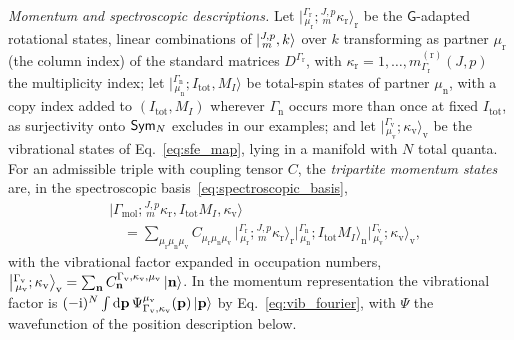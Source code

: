 \documentclass[
  reprint,
  aps,
  prx,
  superscriptaddress,
  amsmath,
  amssymb,
  longbibliography
]{revtex4-2}
\newcommand{\grp}[1]{\mathsf{#1}}
\newcommand{\Sym}[1]{\grp{Sym_{#1}}}
\newcommand{\iunit}{\mathrm{i}}
\newcommand{\diff}{\mathrm{d}}
\newcommand{\repD}[1]{D^{#1}}
\newcommand{\mult}{\kappa}
\newcommand{\cgket}[3]{\bigl\lvert{}^{#1}_{\,#2};#3\bigr\rangle}
\newcommand{\parity}{p}               %
\providecommand{\Gmol}{\Gamma_{\mathrm{mol}}}
\providecommand{\Grot}{\Gamma_{\mathrm{r}}}
\providecommand{\Gvib}{\Gamma_{\mathrm{v}}}
\providecommand{\Gspin}{\Gamma_{\mathrm{n}}}
\begin{document}
\emph{Momentum and spectroscopic descriptions.} Let $\cgket{\Grot}{\mu_{\mathrm r}}{{}^{J,\parity}_{\,m}\mult_{\mathrm r}}_{\mathrm r}$ be the $\grp{G}$-adapted rotational states, linear combinations of $\ket{{}^{J,\parity}_{\,m},k}$ over $k$ transforming as partner $\mu_{\mathrm r}$ (the column index) of the standard matrices $\repD{\Grot}$, with $\mult_{\mathrm r}=1,\dots,m^{(\mathrm r)}_{\Grot}(J,\parity)$ the multiplicity index; let $\cgket{\Gspin}{\mu_{\mathrm n}}{I_{\mathrm{tot}},M_I}$ be total-spin states of partner $\mu_{\mathrm n}$, with a copy index added to $(I_{\mathrm{tot}},M_I)$ wherever $\Gspin$ occurs more than once at fixed $I_{\mathrm{tot}}$, as surjectivity onto $\Sym{\mathnormal{N}}$ excludes in our examples; and let $\cgket{\Gvib}{\mu_{\mathrm v}}{\mult_{\mathrm v}}_{\mathrm v}$ be the vibrational states of Eq.~\eqref{eq:sfe_map}, lying in a manifold with $N$ total quanta. For an admissible triple with coupling tensor $C$, the \emph{tripartite momentum states} are, in the spectroscopic basis~\eqref{eq:spectroscopic_basis},
\begin{align}
  &\bigl|\Gmol;{}^{J,\parity}_{\,m}\mult_{\mathrm r},I_{\mathrm{tot}}M_I,\mult_{\mathrm v}\bigr\rangle
  \nonumber\\
  &\quad=\!\!\sum_{\mu_{\mathrm r}\mu_{\mathrm n}\mu_{\mathrm v}}\!\!
  C_{\mu_{\mathrm r}\mu_{\mathrm n}\mu_{\mathrm v}}\,
  \cgket{\Grot}{\mu_{\mathrm r}}{{}^{J,\parity}_{\,m}\mult_{\mathrm r}}_{\mathrm r}
  \cgket{\Gspin}{\mu_{\mathrm n}}{I_{\mathrm{tot}}M_I}_{\mathrm n}
  \cgket{\Gvib}{\mu_{\mathrm v}}{\mult_{\mathrm v}}_{\mathrm v},
  \label{eq:spectroscopic_states}
\end{align}
with the vibrational factor expanded in occupation numbers, $\cgket{\Gvib}{\mu_{\mathrm v}}{\mult_{\mathrm v}}_{\mathrm v}=\sum_{\mathbf n}C^{\Gvib,\mult_{\mathrm v},\mu_{\mathrm v}}_{\mathbf n}\ket{\mathbf n}$. In the momentum representation the vibrational factor is $(-\iunit)^{N}\int\diff\mathbf p\,\Psi^{\mu_{\mathrm v}}_{\Gvib,\mult_{\mathrm v}}(\mathbf p)\ket{\mathbf p}$ by Eq.~\eqref{eq:vib_fourier}, with $\Psi$ the wavefunction of the position description below.
\end{document}
